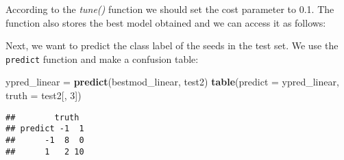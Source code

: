 \documentclass[10pt,ignorenonframetext,]{beamer}
\newenvironment{Shaded}{\begin{snugshade}}{\end{snugshade}}
\newcommand{\KeywordTok}[1]{\textcolor[rgb]{0.13,0.29,0.53}{\textbf{#1}}}
\newcommand{\DataTypeTok}[1]{\textcolor[rgb]{0.13,0.29,0.53}{#1}}
\newcommand{\DecValTok}[1]{\textcolor[rgb]{0.00,0.00,0.81}{#1}}
\newcommand{\StringTok}[1]{\textcolor[rgb]{0.31,0.60,0.02}{#1}}
\newcommand{\OperatorTok}[1]{\textcolor[rgb]{0.81,0.36,0.00}{\textbf{#1}}}
\newcommand{\NormalTok}[1]{#1}
\begin{document}
\begin{frame}[fragile]

According to the \emph{tune()} function we should set the cost parameter
to 0.1. The function also stores the best model obtained and we can
access it as follows:

\begin{Shaded}
\end{Shaded}

Next, we want to predict the class label of the seeds in the test set.
We use the \texttt{predict} function and make a confusion table:

\begin{Shaded}
\begin{Highlighting}[]
\NormalTok{ypred_linear =}\StringTok{ }\KeywordTok{predict}\NormalTok{(bestmod_linear, test2)}
\KeywordTok{table}\NormalTok{(}\DataTypeTok{predict =}\NormalTok{ ypred_linear, }\DataTypeTok{truth =}\NormalTok{ test2[, }\DecValTok{3}\NormalTok{])}
\end{Highlighting}
\end{Shaded}

\begin{verbatim}
##        truth
## predict -1  1
##      -1  8  0
##      1   2 10
\end{verbatim}

\end{frame}
\end{document}
